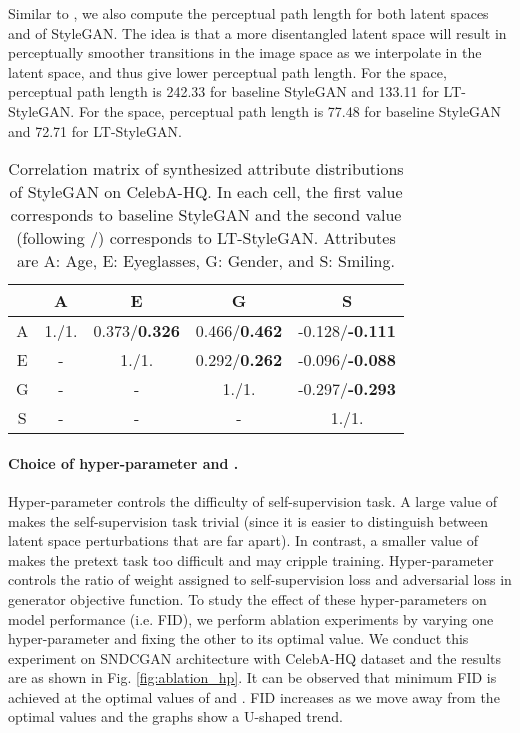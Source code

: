 \documentclass[10pt,twocolumn,letterpaper]{article}
\begin{document}
Similar to \cite{stylegan2019karras}, we also compute the perceptual path length for both latent spaces  and  of StyleGAN. The idea is that a more disentangled latent space will result in perceptually smoother transitions in the image space as we interpolate in the latent space, and thus give lower perceptual path length. For the  space, perceptual path length is 242.33 for baseline StyleGAN and 133.11 for LT-StyleGAN. For the  space, perceptual path length is 77.48 for baseline StyleGAN and 72.71 for LT-StyleGAN.

\begin{table}[t]
\begin{tabular}{|c|c|c|c|c|}
\hline
           & A     & E  & G      & S       \\ \hline
A        & 1./1. & 0.373/\textbf{0.326} & 0.466/\textbf{0.462} & -0.128/\textbf{-0.111} \\ \hline
E & -       & 1./1.     & 0.292/\textbf{0.262} & -0.096/\textbf{-0.088} \\ \hline
G     & -       & -           & 1./1.     & -0.297/\textbf{-0.293} \\ \hline
S    & -       & -           & -           & 1./1.       \\ \hline
\end{tabular}
\caption{\footnotesize{Correlation matrix of synthesized attribute distributions of StyleGAN on CelebA-HQ. In each cell, the first value corresponds to baseline StyleGAN and the second value (following /) corresponds to LT-StyleGAN. Attributes are A: Age, E: Eyeglasses, G: Gender, and S: Smiling.}}
\label{tab:correlation-syn-attr-dis-stylegan}
\end{table}
\vspace{-8pt}
\paragraph{Choice of hyper-parameter  and .} 
Hyper-parameter  controls the difficulty of self-supervision task. A large value of  makes the self-supervision task trivial (since it is easier to distinguish between latent space perturbations that are far apart). In contrast, a smaller value of  makes the pretext task too difficult and may cripple training. Hyper-parameter  controls the ratio of weight assigned to self-supervision loss and adversarial loss in generator objective function. To study the effect of these hyper-parameters on model performance (i.e. FID), we perform ablation experiments by varying one hyper-parameter and fixing the other to its optimal value. We conduct this experiment on SNDCGAN architecture with CelebA-HQ dataset and the results are as shown in Fig. \ref{fig:ablation_hp}. It can be observed that minimum FID is achieved at the optimal values of  and . FID increases as we move away from the optimal values and the graphs show a U-shaped trend.
\end{document}
